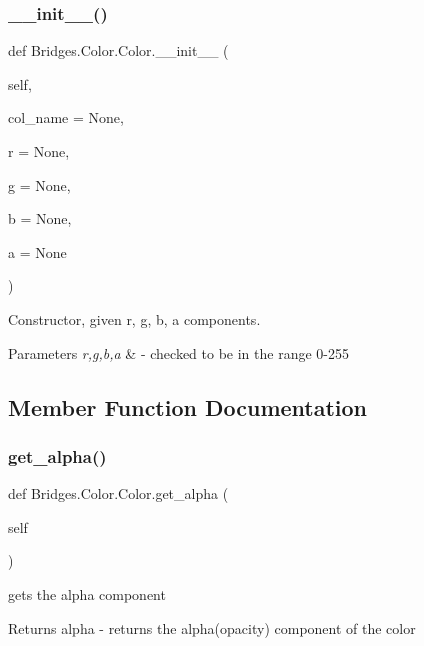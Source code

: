 \subsubsection{\texorpdfstring{\+\_\+\+\_\+init\+\_\+\+\_\+()}{\_\_init\_\_()}}
{\footnotesize\ttfamily def Bridges.\+Color.\+Color.\+\_\+\+\_\+init\+\_\+\+\_\+ (\begin{DoxyParamCaption}\item[{}]{self,  }\item[{}]{col\+\_\+name = {\ttfamily None},  }\item[{}]{r = {\ttfamily None},  }\item[{}]{g = {\ttfamily None},  }\item[{}]{b = {\ttfamily None},  }\item[{}]{a = {\ttfamily None} }\end{DoxyParamCaption})}



Constructor, given r, g, b, a components. 


\begin{DoxyParams}{Parameters}
{\em r,g,b,a} & -\/ checked to be in the range 0-\/255 \\
\hline
\end{DoxyParams}


\subsection{Member Function Documentation}
\mbox{\label{class_bridges_1_1_color_1_1_color_aee2ff0c486cfd6d4f3261b79bafeb2d5}} 
\subsubsection{\texorpdfstring{get\+\_\+alpha()}{get\_alpha()}}
{\footnotesize\ttfamily def Bridges.\+Color.\+Color.\+get\+\_\+alpha (\begin{DoxyParamCaption}\item[{}]{self }\end{DoxyParamCaption})}



gets the alpha component 

\begin{DoxyReturn}{Returns}
alpha -\/ returns the alpha(opacity) component of the color 
\end{DoxyReturn}
\mbox{\label{class_bridges_1_1_color_1_1_color_abdcf7f0ca2f7288e58dad6f7ea5b9824}} 
